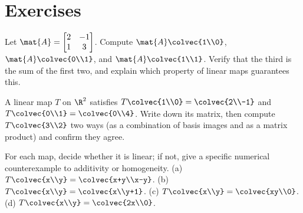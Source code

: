 \section{Exercises}
\label{ch05:exercises}

\begin{exercise}
\label{ch05:ex-act}
Let $\mat{A} = \begin{bmatrix} 2 & -1 \\ 1 & 3 \end{bmatrix}$. Compute
$\mat{A}\colvec{1\\0}$, $\mat{A}\colvec{0\\1}$, and $\mat{A}\colvec{1\\1}$. Verify
that the third is the sum of the first two, and explain which property of linear
maps guarantees this.
\end{exercise}

\begin{exercise}
\label{ch05:ex-build}
A linear map $T$ on $\R^2$ satisfies $T\colvec{1\\0} = \colvec{2\\-1}$ and
$T\colvec{0\\1} = \colvec{0\\4}$. Write down its matrix, then compute
$T\colvec{3\\2}$ two ways (as a combination of basis images and as a matrix
product) and confirm they agree.
\end{exercise}

\begin{exercise}
\label{ch05:ex-linornot}
For each map, decide whether it is linear; if not, give a specific numerical
counterexample to additivity or homogeneity.
(a) $T\colvec{x\\y} = \colvec{x+y\\x-y}$.
(b) $T\colvec{x\\y} = \colvec{x\\y+1}$.
(c) $T\colvec{x\\y} = \colvec{xy\\0}$.
(d) $T\colvec{x\\y} = \colvec{2x\\0}$.
\end{exercise}

